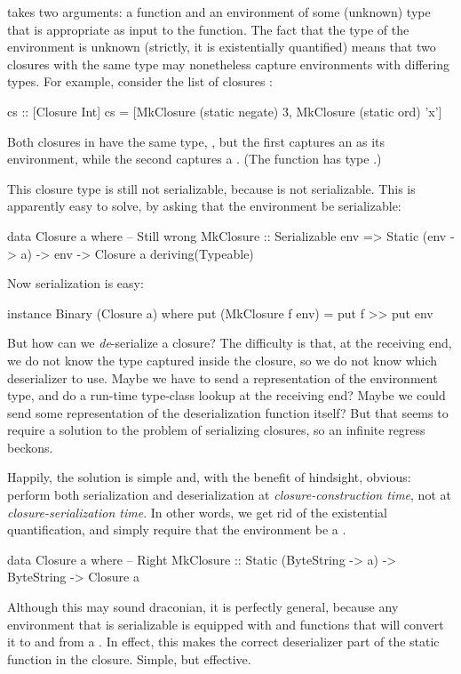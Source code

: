 \documentclass{sigplanconf}
\begin{document}
 takes two arguments: a  function and an environment of some (unknown) type  that is appropriate as input to the function.
The fact that the type of the environment is unknown (strictly, it is existentially quantified) means 
that two closures with the same type may nonetheless capture environments
with differing types.  For example, consider the list of closures :
\begin{code}
  cs :: [Closure Int]
  cs = [MkClosure (static negate) 3,
        MkClosure (static ord)   'x']
\end{code}
Both closures in  have the same type, ,
but the first captures an  as its environment, while the second
captures a \mbox{.}  
(The function  has type .)

This closure type is still not serializable, because  is not serializable.
This is apparently easy to solve, by asking
that the environment be serializable:
\begin{code}
data Closure a where   -- Still wrong
  MkClosure :: Serializable env =>
        			Static (env -> a) -> env -> Closure a
  deriving(Typeable)
\end{code}
Now serialization is easy:
\begin{code}
instance Binary (Closure a) where
   put (MkClosure f env) = put f >> put env
\end{code}
But how can we \emph{de}-serialize a closure?  The difficulty is
that, at the receiving end, we do not know the type captured inside
the closure, so we do not know which deserializer to use. Maybe we have to send a 
representation of the environment type, and do a run-time type-class lookup
at the receiving end?  Maybe
we could send some representation of the deserialization function itself?
But that seems to require a solution to the problem of serializing 
closures, so an infinite regress beckons.

Happily, the solution is simple and, with the benefit of hindsight,
obvious: perform both serialization and deserialization at \emph{closure-construction time},
not at \emph{closure-serialization time}.  
In other words, we get rid of the existential quantification, and simply require that the environment be a .  

\begin{code}
data Closure a where   -- Right
  MkClosure :: Static (ByteString -> a) ->
									ByteString -> Closure a
\end{code}
Although this may sound draconian, it is perfectly general, because any environment  that is serializable is equipped with  and  functions that will convert it to and from a . 
In effect, this makes the  correct deserializer part of the static function in the closure.  Simple, but effective.
\end{document}
